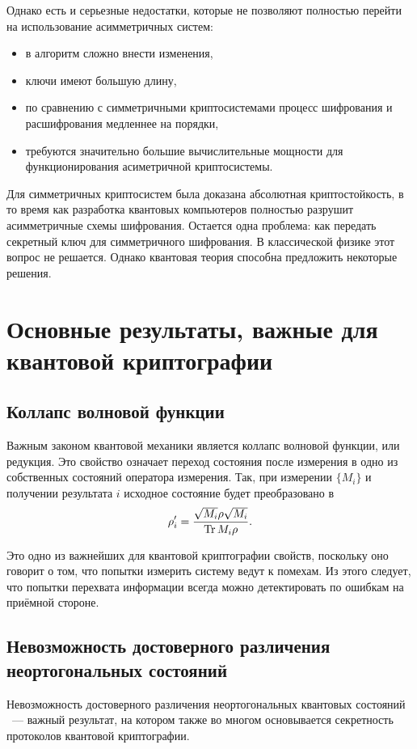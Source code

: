 Однако есть и серьезные недостатки, которые не позволяют полностью перейти на использование асимметричных систем: 
\begin{itemize}
  \item в алгоритм сложно внести изменения, 
  \item ключи имеют большую длину,
  \item по сравнению с симметричными криптосистемами процесс шифрования и расшифрования медленнее на порядки, 
  \item требуются значительно большие вычислительные мощности для функционирования асиметричной криптосистемы. 
\end{itemize}

Для симметричных криптосистем была доказана абсолютная криптостойкость\cite{vernam_security_proof}, в то время как разработка квантовых компьютеров полностью разрушит асимметричные схемы шифрования. Остается одна проблема: как передать секретный ключ для симметричного шифрования. В классической физике этот вопрос не решается. Однако квантовая теория способна предложить некоторые решения.

\section{Основные результаты, важные для квантовой криптографии}

\subsection{Коллапс волновой функции}
Важным законом квантовой механики является коллапс волновой функции, или редукция. Это свойство означает переход состояния после измерения в одно из собственных состояний оператора измерения. Так, при измерении $\{M_i\}$ и получении результата $i$ исходное состояние будет преобразовано в 
\begin{equation} \rho'_i = \frac{\sqrt{M_i} \rho \sqrt{M_i}}{\operatorname{Tr} M_i \rho}. \end{equation}

Это одно из важнейших для квантовой криптографии свойств, поскольку оно говорит о том, что попытки измерить систему ведут к помехам. Из этого следует, что попытки перехвата информации всегда можно детектировать по ошибкам на приёмной стороне.

\subsection{Невозможность достоверного различения неортогональных состояний}\label{no_discrimination_theorem}
Невозможность достоверного различения неортогональных квантовых состояний \cite{non_orthogonal_states_discrimination_theorem}~--- важный результат, на котором также во многом основывается секретность протоколов квантовой криптографии.

